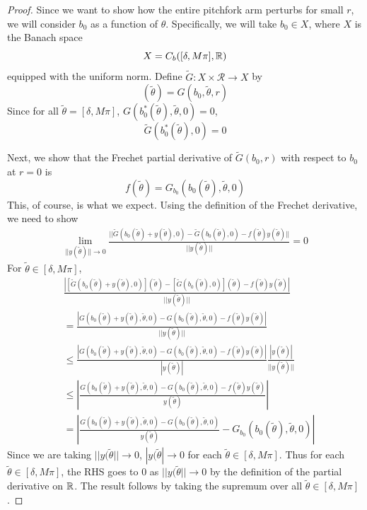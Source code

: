 \documentclass[thesis.tex]{subfiles}
\begin{document}
\begin{lemma}
\begin{proof}
Since we want to show how the entire pitchfork arm perturbs for small $r$, we will consider $b_0$ as a function of $\theta$. Specifically, we will take $b_0 \in X$, where $X$ is the Banach space
\[
X = C_b([\delta, M \pi], {\mathbb R})
\]
equipped with the uniform norm. Define $\tilde{G}: X \times \mathcal{R} \rightarrow X$ by 
\begin{equation}
[\tilde{G}(b_0, r)](\tilde{\theta}) = G(b_0, \tilde{\theta}, r) 
\end{equation}
Since for all $\tilde{\theta} = [\delta, M \pi]$, $G(b_0^*(\tilde{\theta}), \tilde{\theta}, 0) = 0$, 
\[
\tilde{G}(b_0^*(\tilde{\theta}), 0) = 0
\]

Next, we show that the Frechet partial derivative of $\tilde{G}(b_0,r)$ with respect to $b_0$ at $r = 0$ is 
\begin{equation}
f(\tilde{\theta}) = G_{b_0}(b_0(\tilde{\theta}), \tilde{\theta}, 0) 
\end{equation}
This, of course, is what we expect. Using the definition of the Frechet derivative, we need to show 
\begin{align}
\lim_{||y(\tilde{\theta})|| \rightarrow 0} \frac{|| \tilde{G}(b_0(\tilde{\theta}) + y(\tilde{\theta}), 0) - \tilde{G}(b_0(\tilde{\theta}), 0) - f(\tilde{\theta}) y(\tilde{\theta}) ||}{||y(\tilde{\theta})||} = 0
\end{align}
For $\tilde{\theta} \in [\delta, M \pi]$,
\begin{align*}
&\frac{ \left| [\tilde{G}(b_0(\tilde{\theta}) + y(\tilde{\theta}), 0)](\tilde{\theta}) - [\tilde{G}(b_0(\tilde{\theta}), 0)](\tilde{\theta}) - f(\tilde{\theta}) y(\tilde{\theta}) \right| }{||y(\tilde{\theta})||} \\
&=\frac{ \left| G(b_0(\tilde{\theta}) + y(\tilde{\theta}), \tilde{\theta}, 0) - G(b_0(\tilde{\theta}), \tilde{\theta}, 0) - f(\tilde{\theta}) y(\tilde{\theta}) \right| }{||y(\tilde{\theta})||} \\
&\leq \frac{\left| G(b_0(\tilde{\theta}) + y(\tilde{\theta}), \tilde{\theta}, 0) - G(b_0(\tilde{\theta}), \tilde{\theta}, 0) - f(\tilde{\theta}) y(\tilde{\theta})\right|}{|y(\tilde{\theta})|} \frac{|y(\tilde{\theta})|}{||y(\tilde{\theta})||} \\
&\leq \left| \frac{ G(b_0(\tilde{\theta}) + y(\tilde{\theta}), \tilde{\theta}, 0) - G(b_0(\tilde{\theta}), \tilde{\theta}, 0) - f(\tilde{\theta}) y(\tilde{\theta})}{y(\tilde{\theta})} \right| \\
&= \left| \frac{ G(b_0(\tilde{\theta}) + y(\tilde{\theta}), \tilde{\theta}, 0) - G(b_0(\tilde{\theta}), \tilde{\theta}, 0)}{y(\tilde{\theta})} - G_{b_0}(b_0(\tilde{\theta}), \tilde{\theta}, 0) \right|
\end{align*}
Since we are taking $||y(\tilde{\theta}|| \rightarrow 0$, $|y(\tilde{\theta}| \rightarrow 0$ for each $\tilde{\theta} \in [\delta, M \pi]$. Thus for each $\tilde{\theta} \in [\delta, M \pi]$, the RHS goes to 0 as $||y(\tilde{\theta}|| \rightarrow 0$ by the definition of the partial derivative on ${\mathbb R}$. The result follows by taking the supremum over all $\tilde{\theta} \in [\delta, M \pi]$.


\end{proof}
\end{lemma}
\end{document}
